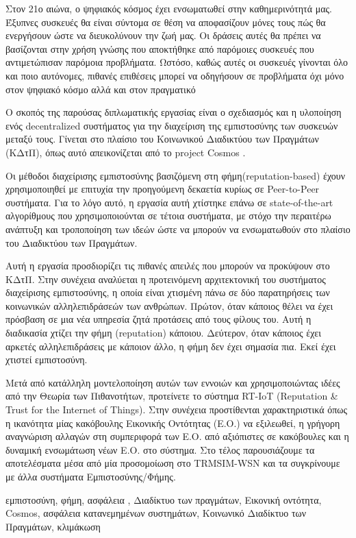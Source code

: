 \begin{abstractgr}
Στον 21ο αιώνα, ο ψηφιακός κόσμος έχει ενσωματωθεί στην καθημερινότητά μας. Έξυπνες συσκευές θα είναι σύντομα σε θέση να αποφασίζουν μόνες τους πώς θα ενεργήσουν ώστε να διευκολύνουν την ζωή μας.
Οι δράσεις αυτές θα πρέπει να βασίζονται στην χρήση γνώσης που αποκτήθηκε  από παρόμοιες συσκευές που αντιμετώπισαν    παρόμοια προβλήματα. Ωστόσο, καθώς αυτές οι συσκευές γίνονται όλο και ποιο αυτόνομες,
πιθανές επιθέσεις μπορεί να οδηγήσουν σε προβλήματα όχι μόνο στον ψηφιακό κόσμο αλλά και στον πραγματικό

Ο σκοπός της παρούσας διπλωματικής εργασίας είναι ο σχεδιασμός και η υλοποίηση ενός decentralized συστήματος για την διαχείριση της εμπιστοσύνης των συσκευών μεταξύ τους. Γίνεται στο πλαίσιο του
Κοινωνικού Διαδικτύου των Πραγμάτων (ΚΔτΠ),
 όπως αυτό απεικονίζεται από το project Cosmos .
 
Οι μέθοδοι διαχείρισης εμπιστοσύνης βασιζόμενη στη φήμη(reputation-based) έχουν χρησιμοποιηθεί με επιτυχία την προηγούμενη
δεκαετία κυρίως σε Peer-to-Peer συστήματα. Για το λόγο αυτό, η εργασία αυτή χτίστηκε επάνω σε 
state-of-the-art αλγορίθμους που χρησιμοποιούνται σε τέτοια συστήματα, με στόχο την περαιτέρω ανάπτυξη και τροποποίηση των
ιδεών ώστε να μπορούν να ενσωματωθούν στο πλαίσιο του Διαδικτύου των Πραγμάτων.
 
Αυτή η εργασία προσδιορίζει τις πιθανές απειλές που μπορούν να προκύψουν στο ΚΔτΠ. Στην συνέχεια αναλύεται η προτεινόμενη αρχιτεκτονική του συστήματος διαχείρισης εμπιστοσύνης, η οποία είναι χτισμένη πάνω σε δύο παρατηρήσεις των κοινωνικών αλληλεπιδράσεών των ανθρώπων.
 Πρώτον, όταν κάποιος θέλει να έχει πρόσβαση σε μια νέα υπηρεσία  ζητά προτάσεις από
τους φίλους του. Αυτή η διαδικασία χτίζει την φήμη (reputation) κάποιου. Δεύτερον, όταν κάποιος έχει αρκετές
αλληλεπιδράσεις με κάποιον άλλο, η φήμη δεν έχει σημασία πια. Εκεί έχει χτιστεί εμπιστοσύνη.
 
Μετά από κατάλληλη μοντελοποίηση αυτών των εννοιών και χρησιμοποιώντας ιδέες από την Θεωρία των Πιθανοτήτων, προτείνετε το σύστημα RT-IoT (Reputation \& Trust for the Internet of Things). Στην συνέχεια προστίθενται χαρακτηριστικά όπως
η ικανότητα μίας κακόβουλης Εικονικής Οντότητας (Ε.Ο.) να εξιλεωθεί, η γρήγορη αναγνώριση 
αλλαγών στη συμπεριφορά των Ε.Ο. από αξιόπιστες σε κακόβουλες και η δυναμική ενσωμάτωση 
νέων Ε.Ο. στο σύστημα. Στο τέλος παρουσιάζουμε τα αποτελέσματα μέσα από μία προσομοίωση στο TRMSIM-WSN και τα συγκρίνουμε με άλλα συστήματα Εμπιστοσύνης/Φήμης.
	
    \begin{keywordsgr}
   εμπιστοσύνη, φήμη, ασφάλεια , Διαδίκτυο των πραγμάτων, Εικονική οντότητα, Cosmos, ασφάλεια κατανεμημένων συστημάτων, Κοινωνικό Διαδίκτυο των Πραγμάτων, κλιμάκωση
	\end{keywordsgr}
	
	
\end{abstractgr}

